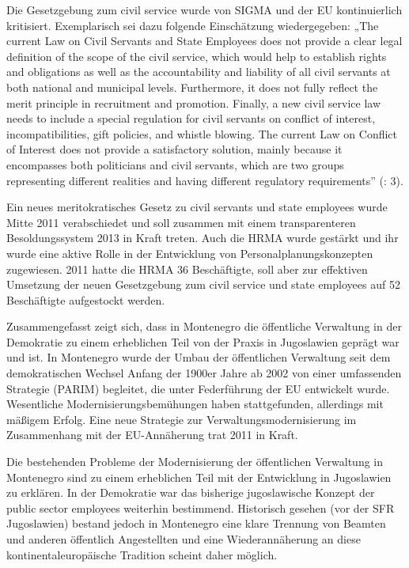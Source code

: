 Die Gesetzgebung zum civil service wurde von SIGMA und der EU kontinuierlich kritisiert. Exemplarisch sei dazu folgende Einschätzung wiedergegeben: „The current Law on Civil Servants and State Employees does not provide a clear legal definition of the scope of the civil service, which would help to establish rights and obligations as well as the accountability and liability of all civil servants at both national and municipal levels. Furthermore, it does not fully reflect the merit principle in recruitment and promotion. Finally, a new civil service law needs to include a special regulation for civil servants on conflict of interest, incompatibilities, gift policies, and whistle blowing. The current Law on Conflict of Interest does not provide a satisfactory solution, mainly because it encompasses both politicians and civil servants, which are two groups representing different realities and having different regulatory requirements” (\cite{oecd10a}: 3).\par
Ein neues meritokratisches Gesetz zu civil servants und state employees wurde Mitte 2011 verabschiedet und soll zusammen mit einem transparenteren Besoldungssystem 2013 in Kraft treten. Auch die HRMA wurde gestärkt und ihr wurde eine aktive Rolle in der Entwicklung von Personalplanungskonzepten zugewiesen. 2011 hatte die HRMA 36 Beschäftigte, soll aber zur effektiven Umsetzung der neuen Gesetzgebung zum civil service und state employees auf 52 Beschäftigte aufgestockt werden.\par
Zusammengefasst zeigt sich, dass in Montenegro die öffentliche Verwaltung in der Demokratie zu einem erheblichen Teil von der Praxis in Jugoslawien geprägt war und ist. In Montenegro wurde der Umbau der öffentlichen Verwaltung seit dem demokratischen Wechsel Anfang der 1900er Jahre ab 2002 von einer umfassenden Strategie (PARIM) begleitet, die unter Federführung der EU entwickelt wurde. Wesentliche Modernisierungsbemühungen haben stattgefunden, allerdings mit mäßigem Erfolg. Eine neue Strategie zur Verwaltungsmodernisierung im Zusammenhang mit der EU-Annäherung trat 2011 in Kraft. \par
Die bestehenden Probleme der Modernisierung der öffentlichen Verwaltung in Montenegro sind zu einem erheblichen Teil mit der Entwicklung in Jugoslawien zu erklären. In der Demokratie war das bisherige jugoslawische Konzept der public sector employees weiterhin bestimmend. Historisch gesehen (vor der SFR Jugoslawien) bestand jedoch in Montenegro eine klare Trennung von Beamten und anderen öffentlich Angestellten und eine Wiederannäherung an diese kontinentaleuropäische Tradition scheint daher möglich. \par
